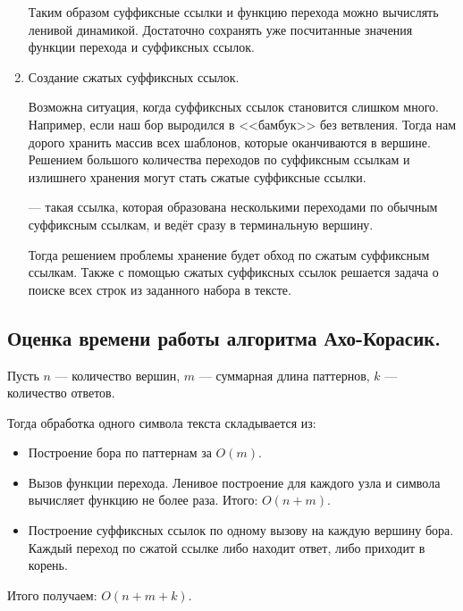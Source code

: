 \begin{enumerate}
\begin{figure}[H]
\begin{center}
               \end{center}
       \end{figure}
       Таким образом суффиксные ссылки и функцию перехода можно вычислять ленивой динамикой.
       Достаточно сохранять уже посчитанные значения функции перехода и суффиксных ссылок.
       \item Создание сжатых суффиксных ссылок.

        Возможна ситуация, когда суффиксных ссылок становится слишком много. Например, если наш бор
        выродился в <<бамбук>> без ветвления. Тогда нам дорого хранить массив всех шаблонов, которые
        оканчиваются в вершине. Решением большого количества переходов по суффиксным ссылкам и излишнего
        хранения могут стать сжатые суффиксные ссылки.
        \begin{definition}
                 --- такая ссылка, которая образована несколькими
                переходами по обычным суффиксным ссылкам, и ведёт сразу в терминальную вершину.
        \end{definition}
        Тогда решением проблемы хранение будет обход по сжатым суффиксным ссылкам. 
        Также с помощью сжатых суффиксных ссылок решается задача о поиске всех строк из
        заданного набора в тексте.
\end{enumerate}

\subsection{Оценка времени работы алгоритма Ахо-Корасик.}
Пусть $n$ --- количество вершин, $m$ --- суммарная длина паттернов, $k$ --- количество ответов.

Тогда обработка одного символа текста складывается из:
\begin{itemize}
        \item Построение бора по паттернам за $O(m)$.
        \item Вызов функции перехода. Ленивое построение для каждого узла и символа вычисляет функцию
        не более раза. Итого: $O(n + m)$.
        \item Построение суффиксных ссылок по одному вызову на каждую вершину бора.
        Каждый переход по сжатой ссылке либо находит ответ, либо приходит в корень.
\end{itemize}
Итого получаем: $O(n + m + k)$.
